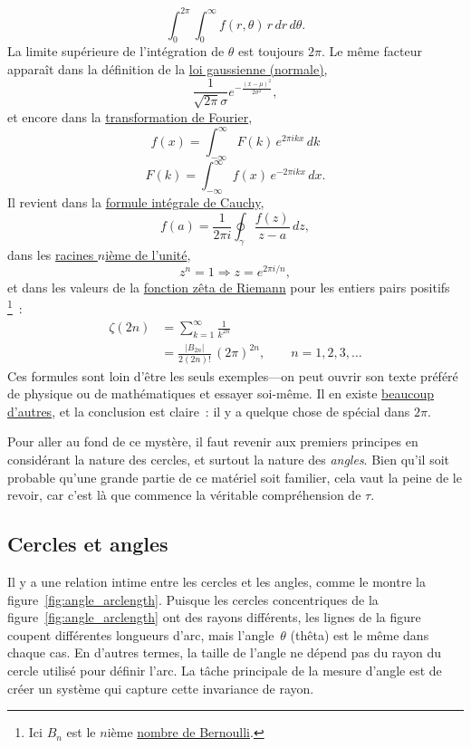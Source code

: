 \[
  \int_0^{2\pi}\int_0^\infty f(r, \theta)\, r\, dr\, d\theta.
\]
La limite supérieure de l'intégration de $\theta$ est toujours $2\pi$. Le même
facteur apparaît dans la définition de la
\href{https://fr.wikipedia.org/wiki/Loi_normale}{loi gaussienne (normale)},
\[
  \frac{1}{\sqrt{2\pi}\sigma}e^{-\frac{(x-\mu)^2}{2\sigma^2}},
\]
et encore dans la
\href{https://fr.wikipedia.org/wiki/Transformation_de_Fourier}{transformation de
Fourier},
\[
  f(x) = \int_{-\infty}^\infty F(k)\, e^{2\pi ikx}\,dk
\]
\[
    F(k) = \int_{-\infty}^\infty f(x)\, e^{-2\pi ikx}\,dx.
\]
Il revient dans la
\href{https://fr.wikipedia.org/wiki/Formule_intégrale_de_Cauchy}{formule
intégrale de Cauchy},
\[
  f(a) = \frac{1}{2\pi i}\oint_\gamma\frac{f(z)}{z-a}\,dz,
\]
dans les \href{https://fr.wikipedia.org/wiki/Racine_de_l%27unité}{racines
$n$ième de l'unité},
\[
  z^n = 1 \Rightarrow z = e^{2\pi i/n},
\]
et dans les valeurs de la
\href{https://fr.wikipedia.org/wiki/Fonction_zêta_de_Riemann}{fonction zêta de
Riemann} pour les entiers pairs positifs\,\footnote{Ici $B_n$ est le $n$ième
\href{https://fr.wikipedia.org/wiki/Nombre_de_Bernoulli}{nombre de
Bernoulli}.}~:
\[
\begin{split}
  \zeta(2n) & = \sum_{k=1}^\infty \frac{1}{k^{2n}} \\
            & = \frac{|B_{2n}|}{2(2n)!}\,(2\pi)^{2n},\qquad n = 1, 2, 3, \ldots
\end{split}
\]
Ces formules sont loin d'être les seuls exemples---on peut ouvrir son texte
préféré de physique ou de mathématiques et essayer soi-même. Il en existe
\href{http://www.harremoes.dk/Peter/Undervis/Turnpage/Turnpage1.html}{beaucoup
d'autres}, et la conclusion est claire~: il y a quelque chose de spécial dans
$2\pi$.

Pour aller au fond de ce mystère, il faut revenir aux premiers principes en
considérant la nature des cercles, et surtout la nature des \emph{angles}. Bien
qu'il soit probable qu'une grande partie de ce matériel soit familier, cela vaut
la peine de le revoir, car c'est là que commence la véritable compréhension de
$\tau$.

  \subsection{Cercles et angles} %
  \label{sec:circles_and_angles}

Il y a une relation intime entre les cercles et les angles, comme le montre la
figure~\ref{fig:angle_arclength}. Puisque les cercles concentriques de la
figure~\ref{fig:angle_arclength} ont des rayons différents, les lignes de la
figure coupent différentes longueurs d'arc, mais l'angle~$\theta$ (thêta) est le
même dans chaque cas. En d'autres termes, la taille de l'angle ne dépend pas du
rayon du cercle utilisé pour définir l'arc. La tâche principale de la mesure
d'angle est de créer un système qui capture cette invariance de rayon.

